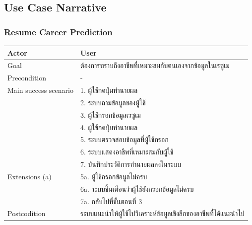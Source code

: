 \subsection{Use Case Narrative}
\subsubsection{Resume Career Prediction}
\begin{table}[H]
    \begin{tabularx}{\textwidth}{|l|X|} 
        \hline
        Actor                 & User                                       \\ \hline
        Goal                  & ต้องการทราบถึงอาชีพที่เหมาะสมกับตนเองจากข้อมูลในเรซูเม            \\ \hline
        Precondition          & -                                               \\ \hline
        Main success scenario & 1. ผู้ใช้กดปุ่มทำนายผล                         \\
        & 2. ระบบถามข้อมูลของผู้ใช้                            \\
        & 3. ผู้ใช้กรอกข้อมูลเรซูเม                                  \\
        & 4. ผู้ใช้กดปุ่มทำนายผล                                \\
        & 5. ระบบตรวจสอบข้อมูลที่ผู้ใช้กรอก                           \\
        & 6. ระบบแสดงอาชีพที่เหมาะสมกับผู้ใช้                    \\
        & 7. บันทึกประวัติการทำนายผลลงในระบบ           \\ \hline
        Extensions (a)        & 5a. ผู้ใช้กรอกข้อมูลไม่ครบ                            \\
        & 6a. ระบบขึ้นเตือนว่าผู้ใช้ยังกรอกข้อมูลไม่ครบ              \\
        & 7a. กลับไปที่ขั้นตอนที่ 3                              \\ \hline
        Postcodition          & ระบบแนะนำให้ผู้ใช้ไปวิเคราะห์ข้อมูลเชิงลึกของอาชีพที่ได้แนะนำไป \\ \hline
    \end{tabularx}
\end{table}

